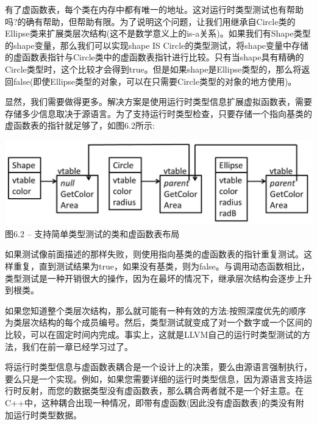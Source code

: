 有了虚函数表，每个类在内存中都有唯一的地址。这对运行时类型测试也有帮助吗?的确有帮助，但帮助有限。为了说明这个问题，让我们用继承自Circle类的Ellipse类来扩展类层次结构(这不是数学意义上的is-a关系)。如果我们有Shape类型的shape变量，那么我们可以实现shape IS Circle的类型测试，将shape变量中存储的虚函数表指针与Circle类中的虚函数表指针进行比较。只有当shape具有精确的Circle类型时，这个比较才会得到true。但是如果shape是Ellipse类型的，那么将返回false(即使Ellipse类型的对象，可以在只需要Circle类型的对象的地方使用)。\par

显然，我们需要做得更多。解决方案是使用运行时类型信息扩展虚拟函数表，需要存储多少信息取决于源语言。为了支持运行时类型检查，只要存储一个指向基类的虚函数表的指针就足够了，如图6.2所示:\par

\hspace*{\fill} \par %
\begin{center}
	\includegraphics{content/2/chapter6/images/2.jpg}\\
	图6.2 – 支持简单类型测试的类和虚函数表布局
\end{center}

如果测试像前面描述的那样失败，则使用指向基类的虚函数表的指针重复测试。这样重复，直到测试结果为true，如果没有基类，则为false。与调用动态函数相比，类型测试是一种开销很大的操作，因为在最坏的情况下，继承层次结构会逐步上升到根类。\par

如果您知道整个类层次结构，那么就可能有一种有效的方法:按照深度优先的顺序为类层次结构的每个成员编号。然后，类型测试就变成了对一个数字或一个区间的比较，可以在固定时间内完成。事实上，这就是LLVM自己的运行时类型测试的方法，我们在前一章已经学习过了。\par

将运行时类型信息与虚函数表耦合是一个设计上的决策，要么由源语言强制执行，要么只是一个实现。例如，如果您需要详细的运行时类型信息，因为源语言支持运行时反射，而您的数据类型没有虚函数表，那么耦合两者就不是一个好主意。在C++中，这种耦合出现一种情况，即带有虚函数(因此没有虚函数表)的类没有附加运行时类型数据。\par

